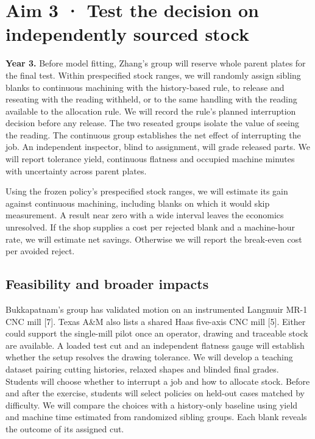 \documentclass[11pt,letterpaper]{article}
\begin{document}
\newpage

\section*{Aim 3 · Test the decision on independently sourced stock}

\textbf{Year 3.} Before model fitting, Zhang’s group will reserve whole parent plates for the final test. Within prespecified stock ranges, we will randomly assign sibling blanks to continuous machining with the history-based rule, to release and reseating with the reading withheld, or to the same handling with the reading available to the allocation rule. We will record the rule’s planned interruption decision before any release. The two reseated groups isolate the value of seeing the reading. The continuous group establishes the net effect of interrupting the job. An independent inspector, blind to assignment, will grade released parts. We will report tolerance yield, continuous flatness and occupied machine minutes with uncertainty across parent plates.

Using the frozen policy’s prespecified stock ranges, we will estimate its gain against continuous machining, including blanks on which it would skip measurement. A result near zero with a wide interval leaves the economics unresolved. If the shop supplies a cost per rejected blank and a machine-hour rate, we will estimate net savings. Otherwise we will report the break-even cost per avoided reject.

\subsection*{Feasibility and broader impacts}

Bukkapatnam’s group has validated motion on an instrumented Langmuir MR-1 CNC mill [7]. Texas A\&M also lists a shared Haas five-axis CNC mill [5]. Either could support the single-mill pilot once an operator, drawing and traceable stock are available. A loaded test cut and an independent flatness gauge will establish whether the setup resolves the drawing tolerance. We will develop a teaching dataset pairing cutting histories, relaxed shapes and blinded final grades. Students will choose whether to interrupt a job and how to allocate stock. Before and after the exercise, students will select policies on held-out cases matched by difficulty. We will compare the choices with a history-only baseline using yield and machine time estimated from randomized sibling groups. Each blank reveals the outcome of its assigned cut.
\end{document}
